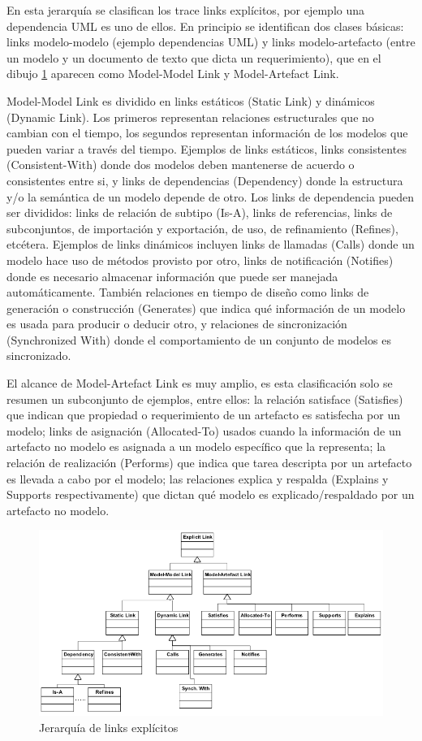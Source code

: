 \documentclass[a4paper,12pt,oneside]{book}
\begin{document}
En esta jerarquía se clasifican los trace links explícitos, por ejemplo una dependencia UML es uno de ellos. En principio se identifican dos clases básicas: links modelo-modelo (ejemplo dependencias UML) y links modelo-artefacto (entre un modelo y un documento de texto que dicta un requerimiento), que en el dibujo \ref{fig:LinksExplicitos} aparecen como Model-Model Link y Model-Artefact Link.

Model-Model Link es dividido en links estáticos (Static Link) y dinámicos (Dynamic Link). Los primeros representan relaciones estructurales que no cambian con el tiempo, los segundos representan información de los modelos que pueden variar a través del tiempo. Ejemplos de links estáticos, links consistentes (Consistent-With) donde dos modelos deben mantenerse de acuerdo o consistentes entre si, y links de dependencias (Dependency) donde la estructura y/o la semántica de un modelo depende de otro. Los links de dependencia pueden ser divididos: links de relación de subtipo (Is-A), links de referencias, links de subconjuntos, de importación y exportación, de uso, de refinamiento (Refines), etcétera. Ejemplos de links dinámicos incluyen links de llamadas (Calls) donde un modelo hace uso de métodos provisto por otro, links de notificación (Notifies) donde es necesario almacenar información que puede ser manejada automáticamente. También relaciones en tiempo de diseño como links de generación o construcción (Generates) que indica qué información de un modelo es usada para producir o deducir otro, y relaciones de sincronización (Synchronized With) donde el comportamiento de un conjunto de modelos es sincronizado.

El alcance de Model-Artefact Link es muy amplio, es esta clasificación solo se resumen un subconjunto de ejemplos, entre ellos: la relación satisface (Satisfies) que indican que propiedad o requerimiento de un artefacto es satisfecha por un modelo; links de asignación (Allocated-To) usados cuando la información de un artefacto no modelo es asignada a un modelo específico que la representa; la relación de realización (Performs) que indica que tarea descripta por un artefacto es llevada a cabo por el modelo; las relaciones explica y respalda (Explains y Supports respectivamente) que dictan qué modelo es explicado/respaldado por un artefacto no modelo.

\begin{figure}[hbtp]
\centering
\includegraphics[scale=0.51]{./img/ExplicitTraceLinks}
\caption{Jerarquía de links explícitos}
\label{fig:LinksExplicitos}
\end{figure}
\end{document}

